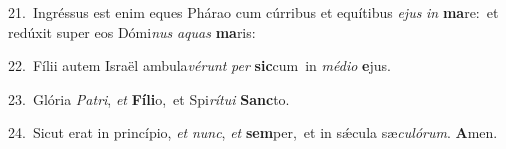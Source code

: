 {\numbfont\textcolor{\numbcolor}{21.}}~Ingréssus est enim eques Phárao cum cúrribus et equítibus \textit{e}\-\textit{jus} \textit{in} \textbf{ma}\-re:~\star et redúxit super eos Dómi\textit{nus} \textit{a}\-\textit{quas} \textbf{ma}\-ris:\par
{\numbfont\textcolor{\numbcolor}{22.}}~Fílii autem Israël ambula\-\textit{vé}\-\textit{runt} \textit{per} \textbf{sic}\-cum~\star in \textit{mé}\-\textit{di}\textit{o} \textbf{e}\-jus.\par
{\numbfont\textcolor{\numbcolor}{23.}}~Glória \textit{Pa}\-\textit{tri}, \textit{et} \textbf{Fí}\-\textbf{li}o,~\star et Spi\-\textit{rí}\-\textit{tu}\textit{i} \textbf{Sanc}\-to.\par
{\numbfont\textcolor{\numbcolor}{24.}}~Sicut erat in princípio, \textit{et} \textit{nunc}\-, \textit{et} \textbf{sem}\-per,~\star et in sǽcula sæ\-\textit{cu}\-\textit{ló}\textit{rum}. \textbf{A}\-men.\par
